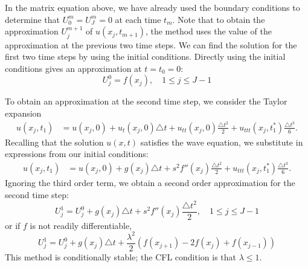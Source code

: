 In the matrix equation above, we have already used the boundary conditions to determine that $U_{0}^{m} = U_{J}^{m} = 0$ at each time $t_m$. 
Note that to obtain the approximation $U_{j}^{m+1}$ of $u(x_j,t_{m+1})$, the method uses the value of the approximation at the previous two time steps.
We can find the solution for the first two time steps by using the initial conditions.
Directly using the initial conditions gives an approximation at $t = t_0 = 0:$
\[U_{j}^{0} = f(x_j), \quad 1 \leq j \leq J-1\]

To obtain an approximation at the second time step, we consider the Taylor expansion 
\begin{align*}
	u(x_j,t_1) &= u(x_j, 0) + u_t(x_j,0) \triangle t + u_{tt}(x_j,0) \frac{\triangle t^2}{2} + u_{ttt}(x_j,t_1^*) \frac{\triangle t^3}{6}.
\end{align*}
Recalling that the solution $u(x,t)$ satisfies the wave equation, we substitute in expressions from our initial conditions: 
\begin{align*}
	u(x_j,t_1) &= u(x_j, 0) +  g(x_j) \triangle t+ s^2 f''(x_j)\frac{\triangle t^2}{2} +  u_{ttt}(x_j,t_1^*) \frac{\triangle t^3}{6}.
\end{align*}
Ignoring the third order term, we obtain a second order approximation for the second time step: 
\[U_{j}^{1}= U_{j}^{0} + g(x_j) \triangle t+ s^2 f''(x_j) \frac{\triangle t^2}{2}, \quad 1 \leq j \leq J-1\]
or if $f$ is not readily differentiable,
\[U_{j}^{1}= U_{j}^{0} + g(x_j) \triangle t+ \frac{\lambda^2}{2} (f(x_{j+1}) -2 f(x_{j}) + f(x_{j-1}))\]
This method is conditionally stable; the CFL condition is that $\lambda \leq 1$.

